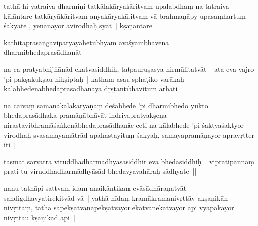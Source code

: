 \documentclass[article,12pt,a4paper]{memoir}%
\newcounter{parCount}
\begin{document}
	  
	  \pstart \leavevmode%
	\label{thakur75-78.30}tathā hi yatraiva dharmiṇi tatkālakāryakāritvam upalabdhaṃ na tatraiva kālāntare tatkāryākāritvam anyakāryakāritvaṃ vā brahmaṇāpy upasaṃhartuṃ śakyate , yenānayor avirodhaḥ syāt | kṣaṇāntare
	{}
	\pend%
      

	  
	  \pstart \leavevmode%
	kathitaprasaṅgaviparyayahetubhyām avaśyambhāvena dharmibhedaprasādhanāt ||
	{}
	\pend%
      

	  
	  \pstart \leavevmode%
	\label{thakur75-79.3}na ca pratyabhijñānād ekatvasiddhiḥ, tatpauruṣasya nirmūlitatvāt | ata eva vajro 'pi pakṣakukṣau nikṣiptaḥ | katham asau sphaṭiko varākaḥ kālabhedenābhedaprasādhanāya dṛṣṭāntībhavitum arhati | 
	{}
	\pend%
      

	  
	  \pstart \leavevmode%
	\label{thakur75-79.5}na caivaṃ samānakālakāryāṇāṃ deśabhede 'pi dharmibhedo yukto bhedaprasādhaka pramāṇābhāvāt indriyapratyakṣeṇa nirastavibhramāśaṅkenābhedaprasādhanāc ceti na kālabhede 'pi śaktyaśaktyor virodhaḥ svasamayamātrād apahastayituṃ śakyaḥ, samayapramāṇayor apravṛtter iti |
	{}
	\pend%
      

	  
	  \pstart \leavevmode%
	\label{thakur75-79.9}tasmāt sarvatra viruddhadharmādhyāsasiddhir eva bhedasiddhiḥ | vipratipannaṃ prati tu viruddhadharmādhyāsād bhedavyavahāraḥ sādhyate ||
	{}
	\pend%
      

	  
	  \pstart \leavevmode%
	\label{thakur75-79.11}nanu tathāpi sattvam idam anaikāntikam evāsādhāraṇatvāt sandigdhavyatirekitvād vā | yathā hīdaṃ kramākramanivṛttāv akṣaṇikān nivṛttaṃ, tathā sāpekṣatvānapekṣatvayor ekatvānekatvayor api vyāpakayor nivṛttau kṣaṇikād api | 
	{}
	\pend%
      
\end{document}
